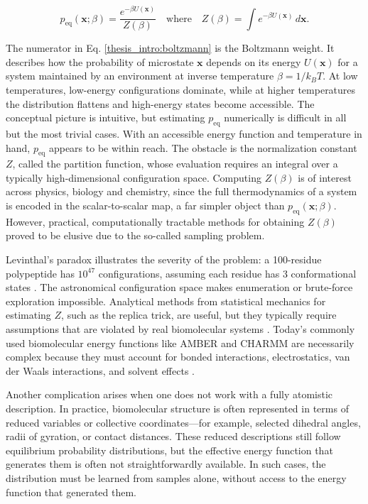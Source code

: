 \begin{equation}
  \label{thesis_intro:boltzmann}
  p_{\mathrm{eq}}(\mathbf{x};\beta)=\frac{e^{-\beta U(\mathbf{x})}}{Z(\beta)}\quad\mathrm{where}
  \quad
  Z(\beta)=\int e^{-\beta U(\mathbf{x})}\,d\mathbf{x}.
\end{equation}

The numerator in Eq. \ref{thesis_intro:boltzmann} is the Boltzmann weight. It describes how the probability of microstate $\mathbf{x}$ depends on its energy $U(\mathbf{x})$ for a system maintained by an environment at inverse temperature $\beta=1/k_BT$. At low temperatures, low-energy configurations dominate, while at higher temperatures the distribution flattens and high-energy states become accessible. The conceptual picture is intuitive, but estimating $p_\mathrm{eq}$ numerically is difficult in all but the most trivial cases. With an accessible energy function and temperature in hand, $p_\mathrm{eq}$ appears to be within reach. The obstacle is the normalization constant $Z$, called the partition function, whose evaluation requires an integral over a typically high-dimensional configuration space. Computing $Z(\beta)$ is of interest across physics, biology and chemistry, since the full thermodynamics of a system is encoded in the scalar-to-scalar map, a far simpler object than $p_{\mathrm{eq}}(\mathbf{x};\beta)$. However, practical, computationally tractable methods for obtaining $Z(\beta)$ proved to be elusive due to the so-called sampling problem.

Levinthal's paradox illustrates the severity of the problem: a 100-residue polypeptide has $10^{47}$ configurations, assuming each residue has 3 conformational states \citep{levinthal1969fold}. The astronomical configuration space makes enumeration or brute-force exploration impossible. Analytical methods from statistical mechanics for estimating $Z$, such as the replica trick, are useful, but they typically require assumptions that are violated by real biomolecular systems \citep{Parisi1997Replica}. Today's commonly used biomolecular energy functions like AMBER and CHARMM are necessarily complex because they must account for bonded interactions, electrostatics, van der Waals interactions, and solvent effects \citep{Wang2004GAFF,Vanommeslaeghe2010CGenFF}.

Another complication arises when one does not work with a fully atomistic description. In practice, biomolecular structure is often represented in terms of reduced variables or collective coordinates---for example, selected dihedral angles, radii of gyration, or contact distances. These reduced descriptions still follow equilibrium probability distributions, but the effective energy function that generates them is often not straightforwardly available. In such cases, the distribution must be learned from samples alone, without access to the energy function that generated them.

